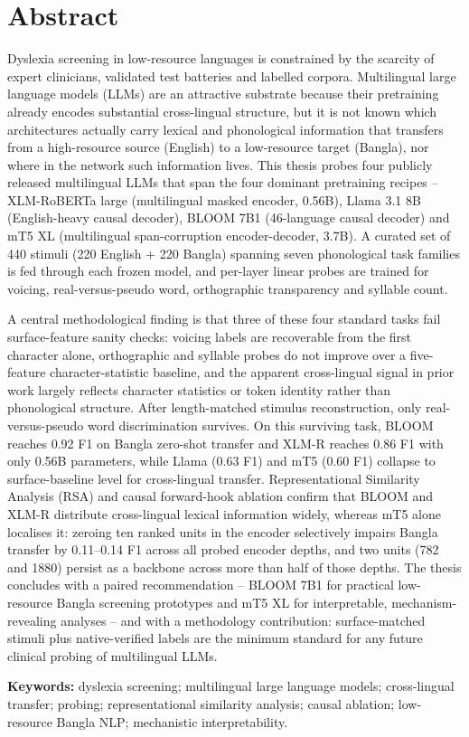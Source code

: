 \section*{Abstract}

Dyslexia screening in low-resource languages is constrained by the scarcity of expert clinicians, validated test batteries and labelled corpora. Multilingual large language models (LLMs) are an attractive substrate because their pretraining already encodes substantial cross-lingual structure, but it is not known which architectures actually carry lexical and phonological information that transfers from a high-resource source (English) to a low-resource target (Bangla), nor where in the network such information lives. This thesis probes four publicly released multilingual LLMs that span the four dominant pretraining recipes -- XLM-RoBERTa large (multilingual masked encoder, 0.56B), Llama 3.1 8B (English-heavy causal decoder), BLOOM 7B1 (46-language causal decoder) and mT5 XL (multilingual span-corruption encoder-decoder, 3.7B). A curated set of 440 stimuli (220 English + 220 Bangla) spanning seven phonological task families is fed through each frozen model, and per-layer linear probes are trained for voicing, real-versus-pseudo word, orthographic transparency and syllable count.

A central methodological finding is that three of these four standard tasks fail surface-feature sanity checks: voicing labels are recoverable from the first character alone, orthographic and syllable probes do not improve over a five-feature character-statistic baseline, and the apparent cross-lingual signal in prior work largely reflects character statistics or token identity rather than phonological structure. After length-matched stimulus reconstruction, only real-versus-pseudo word discrimination survives. On this surviving task, BLOOM reaches 0.92 F1 on Bangla zero-shot transfer and XLM-R reaches 0.86 F1 with only 0.56B parameters, while Llama (0.63 F1) and mT5 (0.60 F1) collapse to surface-baseline level for cross-lingual transfer. Representational Similarity Analysis (RSA) and causal forward-hook ablation confirm that BLOOM and XLM-R distribute cross-lingual lexical information widely, whereas mT5 alone localises it: zeroing ten ranked units in the encoder selectively impairs Bangla transfer by 0.11--0.14 F1 across all probed encoder depths, and two units (782 and 1880) persist as a backbone across more than half of those depths. The thesis concludes with a paired recommendation -- BLOOM 7B1 for practical low-resource Bangla screening prototypes and mT5 XL for interpretable, mechanism-revealing analyses -- and with a methodology contribution: surface-matched stimuli plus native-verified labels are the minimum standard for any future clinical probing of multilingual LLMs.

\vspace{1cm}
\textbf{Keywords:} dyslexia screening; multilingual large language models; cross-lingual transfer; probing; representational similarity analysis; causal ablation; low-resource Bangla NLP; mechanistic interpretability.
\pagebreak
